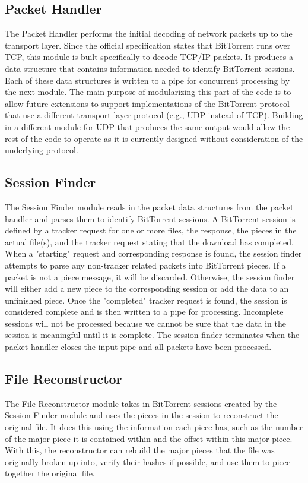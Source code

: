 \documentclass{acm_proc_article-sp}
\begin{document}
\subsection{Packet Handler}
The Packet Handler performs the initial decoding of network packets up to the
transport layer. Since the official specification states that BitTorrent runs
over TCP, this module is built specifically to decode TCP/IP packets. It
produces a data structure that contains information needed to identify
BitTorrent sessions. Each of these data structures is written to a pipe for
concurrent processing by the next module. The main purpose of modularizing this
part of the code is to allow future extensions to support implementations of
the BitTorrent protocol that use a different transport layer protocol
(e.g., UDP instead of TCP). Building in a different module for UDP that
produces the same output would allow the rest of the code to operate as it is
currently designed without consideration of the underlying protocol.

\subsection{Session Finder}
The Session Finder module reads in the packet data structures from the packet
handler and parses them to identify BitTorrent sessions. A BitTorrent session is
defined by a tracker request for one or more files, the response, the pieces in
the actual file(s), and the tracker request stating that the download has
completed. When a "starting" request and corresponding response is found, the
session finder attempts to parse any non-tracker related packets into BitTorrent
pieces. If a packet is not a piece message, it will be discarded. Otherwise, the
session finder will either add a new piece to the corresponding session or add
the data to an unfinished piece. Once the "completed" tracker request is found,
the session is considered complete and is then written to a pipe for
processing. Incomplete sessions will not be processed because we cannot be sure
that the data in the session is meaningful until it is complete. The session
finder terminates when the packet handler closes the input pipe and all packets
have been processed.

\subsection{File Reconstructor}
The File Reconstructor module takes in BitTorrent sessions created by the
Session Finder module and uses the pieces in the session to reconstruct the
original file.  It does this using the information each piece has, such as the
number of the major piece it is contained within and the offset within this
major piece.  With this, the reconstructor can rebuild the major pieces that
the file was originally broken up into, verify their hashes if possible, and
use them to piece together the original file.
\end{document}
